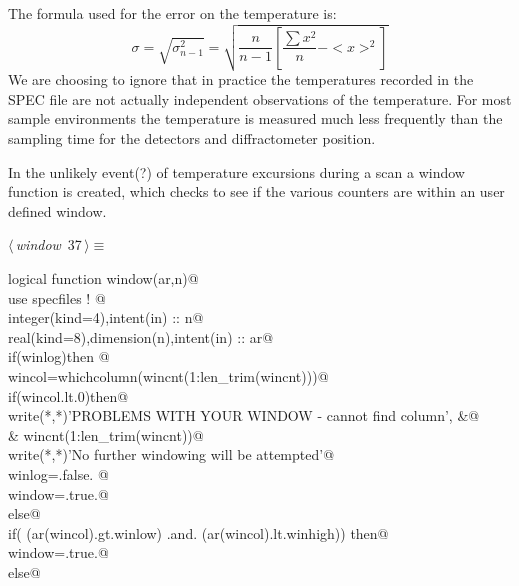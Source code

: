 \documentclass[10pt,a4paper,notitlepage]{article}
\begin{document}
The formula used for the error on the temperature is:
\[ \sigma = \sqrt{ \sigma_{n-1}^{2} } =
\sqrt{ \frac{n}{n-1}\left[ \frac{ \sum {x^{2}} }{n} - <x>^{2} \right] } \]
We are choosing to ignore that in practice the temperatures recorded in the
SPEC file are not actually independent observations of the temperature. 
For most sample environments the temperature is measured much less
frequently than the sampling time for the detectors and diffractometer position.

In the unlikely event(?) of temperature excursions during a scan a window 
function is created, which checks to see if the various counters are 
within an user defined window.

\begin{flushleft} \small
\begin{minipage}{\linewidth}\label{scrap40}\raggedright\small
{} $\langle\,${\it window}\nobreak\ {\footnotesize {37}}$\,\rangle\equiv$
\vspace{-1ex}
\begin{list}{}{} \item
\mbox{}\verb@      logical function window(ar,n)@\\
\mbox{}\verb@      use specfiles ! @\\
\mbox{}\verb@      integer(kind=4),intent(in) :: n@\\
\mbox{}\verb@      real(kind=8),dimension(n),intent(in) :: ar@\\
\mbox{}\verb@      if(winlog)then @\\
\mbox{}\verb@        wincol=whichcolumn(wincnt(1:len_trim(wincnt)))@\\
\mbox{}\verb@        if(wincol.lt.0)then@\\
\mbox{}\verb@           write(*,*)'PROBLEMS WITH YOUR WINDOW - cannot find column', &@\\
\mbox{}\verb@     & wincnt(1:len_trim(wincnt))@\\
\mbox{}\verb@           write(*,*)'No further windowing will be attempted'@\\
\mbox{}\verb@           winlog=.false. @\\
\mbox{}\verb@           window=.true.@\\
\mbox{}\verb@        else@\\
\mbox{}\verb@          if( (ar(wincol).gt.winlow) .and. (ar(wincol).lt.winhigh)) then@\\
\mbox{}\verb@            window=.true.@\\
\mbox{}\verb@          else@\\

\end{list}
\end{minipage}
\end{flushleft}
\end{document}
